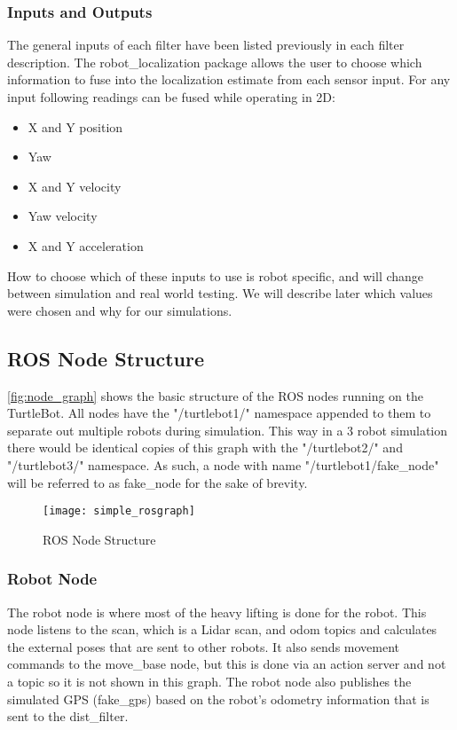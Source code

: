 \documentclass[thesis.tex]{subfile}
\begin{document}
\subsubsection{Inputs and Outputs}
The general inputs of each filter have been listed previously in each filter description. The robot\_localization package allows the user to choose which information to fuse into the localization estimate from each sensor input. For any input following readings can be fused while operating in 2D:
\begin{itemize}
\item X and Y position
\item Yaw
\item X and Y velocity
\item Yaw velocity
\item X and Y acceleration
\end{itemize}
How to choose which of these inputs to use is robot specific, and will change between simulation and real world testing. We will describe later which values were chosen and why for our simulations.
 
\subsection{ROS Node Structure}
\autoref{fig:node_graph} shows the basic structure of the ROS nodes running on the TurtleBot. All nodes have the "/turtlebot1/" namespace appended to them to separate out multiple robots during simulation. This way in a 3 robot simulation there would be identical copies of this graph with the "/turtlebot2/" and "/turtlebot3/" namespace. As such, a node with name "/turtlebot1/fake\_node" will be referred to as fake\_node for the sake of brevity.
 
\begin{landscape}
\begin{figure}
\texttt{[image: simple\_rosgraph]}
\caption{ROS Node Structure}
\label{fig:node_graph}
\end{figure}
\end{landscape}

\subsubsection{Robot Node}
The robot node is where most of the heavy lifting is done for the robot. This node listens to the scan, which is a Lidar scan, and odom topics and calculates the external poses that are sent to other robots. It also sends movement commands to the move\_base node, but this is done via an action server and not a topic so it is not shown in this graph. The robot node also publishes the simulated GPS (fake\_gps) based on the robot's odometry information that is sent to the \gls{dist_filter}.
\end{document}

